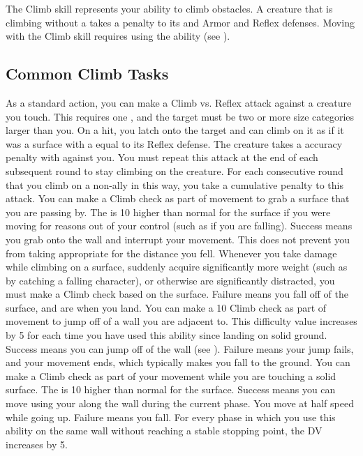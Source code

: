 \newpage
{}
  The Climb skill represents your ability to climb obstacles.
  A creature that is climbing without a  takes a  penalty to its  and Armor and Reflex defenses.
  Moving with the Climb skill requires using the  ability (see ).

  \subsection{Common Climb Tasks}
     As a standard action, you can make a Climb vs. Reflex attack against a creature you touch.
    This requires one , and the target must be two or more size categories larger than you.
    On a hit, you latch onto the target and can climb on it as if it was a surface with a  equal to its Reflex defense.
    The creature takes a  accuracy penalty with  against you.
    You must repeat this attack at the end of each subsequent round to stay climbing on the creature.
    For each consecutive round that you climb on a non-ally in this way, you take a cumulative  penalty to this attack.
     You can make a Climb check as part of movement to grab a surface that you are passing by.
    The  is 10 higher than normal for the surface if you were moving for reasons out of your control (such as if you are falling).
    Success means you grab onto the wall and interrupt your movement.
    This does not prevent you from taking  appropriate for the distance you fell.
     Whenever you take damage while climbing on a surface, suddenly acquire significantly more weight (such as by catching a falling character), or otherwise are significantly distracted, you must make a Climb check based on the surface.
    Failure means you fall off of the surface, and are \prone when you land.
     You can make a  10 Climb check as part of movement to jump off of a wall you are adjacent to.
    This difficulty value increases by 5 for each time you have used this ability since landing on solid ground.
    Success means you can jump off of the wall (see ).
    Failure means your jump fails, and your movement ends, which typically makes you fall to the ground.
     You can make a Climb check as part of your movement while you are touching a solid surface.
    The  is 10 higher than normal for the surface.
    Success means you can move using your  along the wall during the current phase.
    You move at half speed while going up.
    Failure means you fall.
    For every phase in which you use this ability on the same wall without reaching a stable stopping point, the DV increases by 5.

